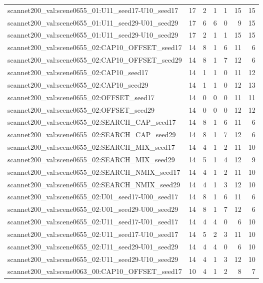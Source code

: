 \begin{table}[t]
\begin{tabular}{lrrrrrr}
scannet200\_val:scene0655\_01:U11\_seed17-U10\_seed17 & 17 & 2 & 1 & 1 & 15 & 15 \\
scannet200\_val:scene0655\_01:U11\_seed29-U01\_seed29 & 17 & 6 & 6 & 0 & 9 & 15 \\
scannet200\_val:scene0655\_01:U11\_seed29-U10\_seed29 & 17 & 2 & 1 & 1 & 15 & 15 \\
scannet200\_val:scene0655\_02:CAP10\_OFFSET\_seed17 & 14 & 8 & 1 & 6 & 11 & 6 \\
scannet200\_val:scene0655\_02:CAP10\_OFFSET\_seed29 & 14 & 8 & 1 & 7 & 12 & 6 \\
scannet200\_val:scene0655\_02:CAP10\_seed17 & 14 & 1 & 1 & 0 & 11 & 12 \\
scannet200\_val:scene0655\_02:CAP10\_seed29 & 14 & 1 & 1 & 0 & 12 & 13 \\
scannet200\_val:scene0655\_02:OFFSET\_seed17 & 14 & 0 & 0 & 0 & 11 & 11 \\
scannet200\_val:scene0655\_02:OFFSET\_seed29 & 14 & 0 & 0 & 0 & 12 & 12 \\
scannet200\_val:scene0655\_02:SEARCH\_CAP\_seed17 & 14 & 8 & 1 & 6 & 11 & 6 \\
scannet200\_val:scene0655\_02:SEARCH\_CAP\_seed29 & 14 & 8 & 1 & 7 & 12 & 6 \\
scannet200\_val:scene0655\_02:SEARCH\_MIX\_seed17 & 14 & 4 & 1 & 2 & 11 & 10 \\
scannet200\_val:scene0655\_02:SEARCH\_MIX\_seed29 & 14 & 5 & 1 & 4 & 12 & 9 \\
scannet200\_val:scene0655\_02:SEARCH\_NMIX\_seed17 & 14 & 4 & 1 & 2 & 11 & 10 \\
scannet200\_val:scene0655\_02:SEARCH\_NMIX\_seed29 & 14 & 4 & 1 & 3 & 12 & 10 \\
scannet200\_val:scene0655\_02:U01\_seed17-U00\_seed17 & 14 & 8 & 1 & 6 & 11 & 6 \\
scannet200\_val:scene0655\_02:U01\_seed29-U00\_seed29 & 14 & 8 & 1 & 7 & 12 & 6 \\
scannet200\_val:scene0655\_02:U11\_seed17-U01\_seed17 & 14 & 4 & 4 & 0 & 6 & 10 \\
scannet200\_val:scene0655\_02:U11\_seed17-U10\_seed17 & 14 & 5 & 2 & 3 & 11 & 10 \\
scannet200\_val:scene0655\_02:U11\_seed29-U01\_seed29 & 14 & 4 & 4 & 0 & 6 & 10 \\
scannet200\_val:scene0655\_02:U11\_seed29-U10\_seed29 & 14 & 4 & 1 & 3 & 12 & 10 \\
scannet200\_val:scene0063\_00:CAP10\_OFFSET\_seed17 & 10 & 4 & 1 & 2 & 8 & 7 \\

\end{tabular}
\end{table}
